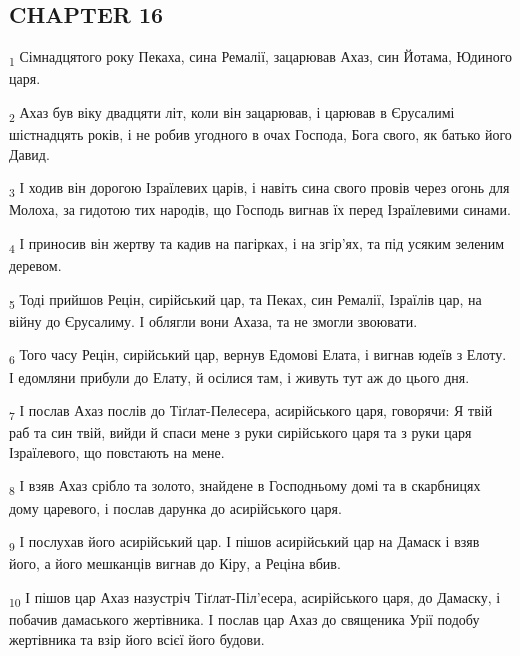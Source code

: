 \subsection{CHAPTER 16}
\begin{tcolorbox}
\textsubscript{1} Сімнадцятого року Пекаха, сина Ремалії, зацарював Ахаз, син Йотама, Юдиного царя.
\end{tcolorbox}
\begin{tcolorbox}
\textsubscript{2} Ахаз був віку двадцяти літ, коли він зацарював, і царював в Єрусалимі шістнадцять років, і не робив угодного в очах Господа, Бога свого, як батько його Давид.
\end{tcolorbox}
\begin{tcolorbox}
\textsubscript{3} І ходив він дорогою Ізраїлевих царів, і навіть сина свого провів через огонь для Молоха, за гидотою тих народів, що Господь вигнав їх перед Ізраїлевими синами.
\end{tcolorbox}
\begin{tcolorbox}
\textsubscript{4} І приносив він жертву та кадив на пагірках, і на згір'ях, та під усяким зеленим деревом.
\end{tcolorbox}
\begin{tcolorbox}
\textsubscript{5} Тоді прийшов Рецін, сирійський цар, та Пеках, син Ремалії, Ізраїлів цар, на війну до Єрусалиму. І облягли вони Ахаза, та не змогли звоювати.
\end{tcolorbox}
\begin{tcolorbox}
\textsubscript{6} Того часу Рецін, сирійський цар, вернув Едомові Елата, і вигнав юдеїв з Елоту. І едомляни прибули до Елату, й осілися там, і живуть тут аж до цього дня.
\end{tcolorbox}
\begin{tcolorbox}
\textsubscript{7} І послав Ахаз послів до Тіґлат-Пелесера, асирійського царя, говорячи: Я твій раб та син твій, вийди й спаси мене з руки сирійського царя та з руки царя Ізраїлевого, що повстають на мене.
\end{tcolorbox}
\begin{tcolorbox}
\textsubscript{8} І взяв Ахаз срібло та золото, знайдене в Господньому домі та в скарбницях дому царевого, і послав дарунка до асирійського царя.
\end{tcolorbox}
\begin{tcolorbox}
\textsubscript{9} І послухав його асирійський цар. І пішов асирійський цар на Дамаск і взяв його, а його мешканців вигнав до Кіру, а Реціна вбив.
\end{tcolorbox}
\begin{tcolorbox}
\textsubscript{10} І пішов цар Ахаз назустріч Тіґлат-Піл'есера, асирійського царя, до Дамаску, і побачив дамаського жертівника. І послав цар Ахаз до священика Урії подобу жертівника та взір його всієї його будови.
\end{tcolorbox}
